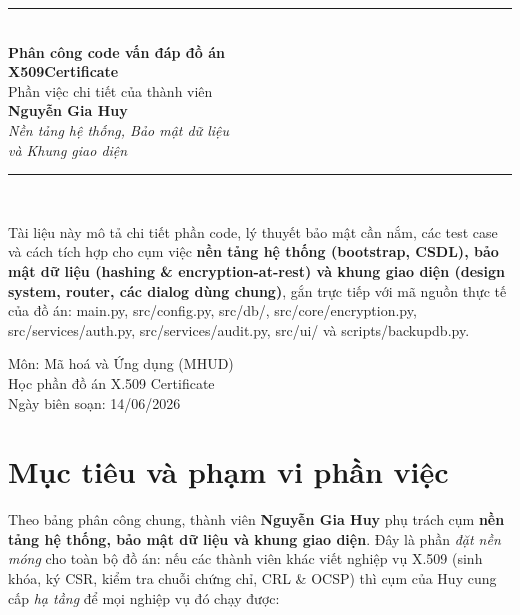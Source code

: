 \documentclass[12pt,a4paper]{article}
\newcommand{\code}[1]{{\ttfamily\small\def\_{\textunderscore\discretionary{}{}{}}#1}}
\begin{document}
\begin{titlepage}
\centering
\vspace*{2.2cm}
{\color{accent}\rule{\linewidth}{1.2pt}}\\[0.6cm]
{\Huge\bfseries Phân công code vấn đáp đồ án}\\[0.35cm]
{\Huge\bfseries\color{accent} X509Certificate}\\[0.5cm]
{\Large Phần việc chi tiết của thành viên}\\[0.3cm]
{\LARGE\bfseries Nguyễn Gia Huy}\\[0.45cm]
{\large\itshape Nền tảng hệ thống, Bảo mật dữ liệu\\ và Khung giao diện}\\[0.5cm]
{\color{accent}\rule{\linewidth}{1.2pt}}\\[1.4cm]

\begin{minipage}{0.85\linewidth}
\centering\small
Tài liệu này mô tả chi tiết phần code, lý thuyết bảo mật cần nắm, các test case
và cách tích hợp cho cụm việc \textbf{nền tảng hệ thống (bootstrap, CSDL), bảo
mật dữ liệu (hashing \& encryption-at-rest) và khung giao diện (design system,
router, các dialog dùng chung)}, gắn trực tiếp với mã nguồn thực tế của đồ án:
\code{main.py}, \code{src/config.py}, \code{src/db/}, \code{src/core/encryption.py},
\code{src/services/auth.py}, \code{src/services/audit.py}, \code{src/ui/} và
\code{scripts/backup\_db.py}.
\end{minipage}

\vfill
{\large Môn: Mã hoá và Ứng dụng (MHUD)}\\[0.2cm]
{\large Học phần đồ án X.509 Certificate}\\[0.6cm]
{\small Ngày biên soạn: 14/06/2026}
\end{titlepage}

\tableofcontents
\thispagestyle{fancy}
\clearpage

\section{Mục tiêu và phạm vi phần việc}

Theo bảng phân công chung, thành viên \textbf{Nguyễn Gia Huy} phụ trách cụm
\textbf{nền tảng hệ thống, bảo mật dữ liệu và khung giao diện}. Đây là phần
\emph{đặt nền móng} cho toàn bộ đồ án: nếu các thành viên khác viết nghiệp vụ
X.509 (sinh khóa, ký CSR, kiểm tra chuỗi chứng chỉ, CRL \& OCSP) thì cụm của Huy
cung cấp \emph{hạ tầng} để mọi nghiệp vụ đó chạy được:
\end{document}
